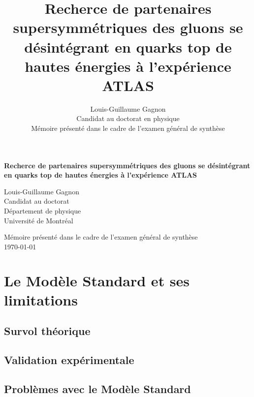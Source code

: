 \documentclass[12pt,canadien]{article}
\title{\textbf{Recherce de partenaires supersymmétriques des gluons se
  désintégrant en quarks top de hautes énergies à l'expérience ATLAS}}
\author{Louis-Guillaume Gagnon \\ Candidat au doctorat en physique \\ Mémoire présenté dans le cadre de l'examen général de synthèse}
\begin{document}
\thispagestyle{empty}
\begin{center}
\begin{minipage}{0.75\linewidth}
    \centering
    \vspace{3cm}
    {\bf {\Large Recherce de partenaires supersymmétriques des gluons se
  désintégrant en quarks top de hautes énergies à l'expérience ATLAS \\ }}
    \vspace{3cm}
    {{\Large Louis-Guillaume Gagnon}\\Candidat au doctorat\\ Département de physique\\ Université de Montréal\par}
    \vspace{3cm}
    {\Large Mémoire présenté dans le cadre de l'examen général de synthèse\\}
    \vspace{4cm}
    {\Large \today}
\end{minipage}
\end{center}
\clearpage


\tableofcontents{}
\clearpage
\doublespacing

\section{Le Modèle Standard et ses limitations}
\label{sec:ms}

\blindtext

\subsection{Survol théorique}
\label{sec:ms:th}

\blindtext[5]

\subsection{Validation expérimentale}
\label{sec:ms:exp}

\subsection{Problèmes avec le Modèle Standard}
\label{sec:ms:problemes}
\end{document}
